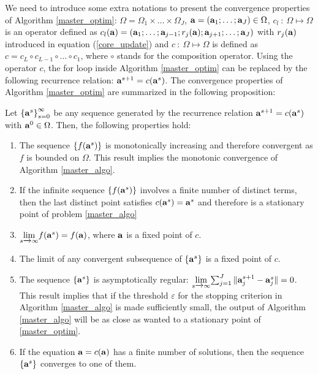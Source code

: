 \documentclass[
]{jss}
\begin{document}
We need to introduce some extra notations to present the convergence
properties of Algorithm \ref{master_optim}:
\(\Omega = \Omega_1 \times \ldots \times \Omega_J\),
\(\mathbf{a} = \left(\mathbf{a}_1; \ldots;\mathbf{a}_J\right) \in \Omega\),
\(c_l~:~\Omega\mapsto\Omega\) is an operator defined as
\(c_l(\mathbf{a}) = \left(\mathbf{a}_1; \ldots; \mathbf{a}_{j-1} ; r_j(\mathbf{a}) ; \mathbf{a}_{j+1} ; \ldots; \mathbf{a}_J\right)\)
with \(r_j(\mathbf{a})\) introduced in equation (\ref{core_update}) and
\(c~:~\Omega\mapsto\Omega\) is defined as
\(c = c_L\circ c_{L-1}\circ ... \circ c_1\), where \(\circ\) stands for
the composition operator. Using the operator \(c\), the
\guillemotleft for loop\guillemotright{} inside Algorithm
\ref{master_optim} can be replaced by the following recurrence relation:
\(\mathbf{a}^{s+1} = c(\mathbf{a}^s)\). The convergence properties of Algorithm
\ref{master_optim} are summarized in the following proposition:

\begin{proposition}
    Let $\left\lbrace \mathbf{a}^s\right\rbrace_{s=0}^{\infty}$ be any sequence 
    generated by the recurrence relation $\mathbf{a}^{s+1} = c(\mathbf{a}^s)$ with 
    $\mathbf{a}^0\in\Omega$. Then, the following properties hold:
    \begin{enumerate}[topsep=0pt,itemsep=-0.75ex,partopsep=1ex,parsep=1ex, label = {(\alph*)}]
        \item  \label{prop_pt1} The sequence $\left\lbrace f(\mathbf{a}^s)\right\rbrace $ is monotonically increasing and therefore convergent as $f$ is bounded on $\Omega$. This result implies the monotonic convergence of Algorithm \ref{master_algo}.
        \item  \label{prop_pt2} If the infinite sequence $\left\lbrace f(\mathbf{a}^s)\right\rbrace $ involves a finite number of distinct terms, then the last distinct point satisfies $c(\mathbf{a}^s) = \mathbf{a}^s$ and therefore is a stationary point of problem \ref{master_algo} 
    \item  \label{prop_pt3} $\underset{s\xrightarrow[]{}\infty}\lim{f(\ensuremath{\mathbf{a}}^s) = f(\ensuremath{\mathbf{a}})}$, where $\mathbf{a}$ is a fixed point of $c$.
        \item  \label{prop_pt4} The limit of any convergent subsequence of $\left\lbrace \mathbf{a}^s\right\rbrace $ is a fixed point of $c$.
        \item  \label{prop_pt5} The sequence $\left\lbrace \mathbf{a}^s \right\rbrace $ is asymptotically regular: $\underset{s\xrightarrow[]{}\infty}\lim{\sum_{j=1}^{J} \Vert \ensuremath{\mathbf{a}}_j^{s+1} - \ensuremath{\mathbf{a}}_j^s \Vert} = 0$. This result implies that if the threshold $\varepsilon$ for the stopping criterion in Algorithm \ref{master_algo} is made sufficiently small, the output of Algorithm \ref{master_algo} will be as close as wanted to a stationary point of \ref{master_optim}. 
        \item  \label{prop_pt6} If the equation $\mathbf{a} = c(\mathbf{a})$ has a finite number of solutions, then the sequence $\left\lbrace \mathbf{a}^s\right\rbrace $ converges to one of them.
    \end{enumerate}
    \label{cv_prop}
\end{proposition}
\end{document}
